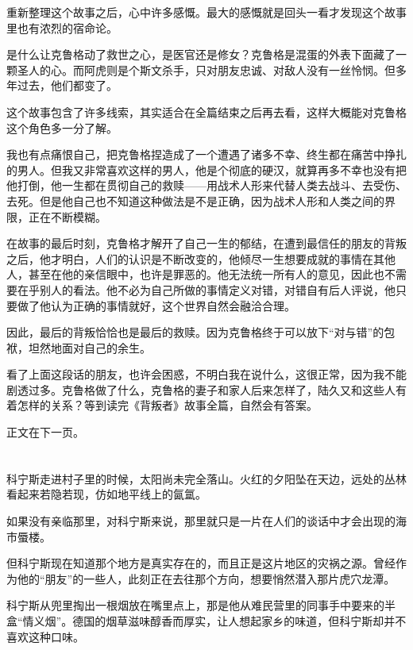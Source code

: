 



重新整理这个故事之后，心中许多感慨。最大的感慨就是回头一看才发现这个故事里也有浓烈的宿命论。

是什么让克鲁格动了救世之心，是医官还是修女？克鲁格是混蛋的外表下面藏了一颗圣人的心。而阿虎则是个斯文杀手，只对朋友忠诚、对敌人没有一丝怜悯。但多年过去，他们都变了。

这个故事包含了许多线索，其实适合在全篇结束之后再去看，这样大概能对克鲁格这个角色多一分了解。

我也有点痛恨自己，把克鲁格捏造成了一个遭遇了诸多不幸、终生都在痛苦中挣扎的男人。但我又非常喜欢这样的男人，他是个彻底的硬汉，就算再多不幸也没有把他打倒，他一生都在贯彻自己的救赎——用战术人形来代替人类去战斗、去受伤、去死。但是他自己也不知道这种做法是不是正确，因为战术人形和人类之间的界限，正在不断模糊。

在故事的最后时刻，克鲁格才解开了自己一生的郁结，在遭到最信任的朋友的背叛之后，他才明白，人们的认识是不断改变的，他倾尽一生想要成就的事情在其他人，甚至在他的亲信眼中，也许是罪恶的。他无法统一所有人的意见，因此也不需要在乎别人的看法。他不必为自己所做的事情定义对错，对错自有后人评说，他只要做了他认为正确的事情就好，这个世界自然会融洽合理。

因此，最后的背叛恰恰也是最后的救赎。因为克鲁格终于可以放下“对与错”的包袱，坦然地面对自己的余生。

看了上面这段话的朋友，也许会困惑，不明白我在说什么，这很正常，因为我不能剧透过多。克鲁格做了什么，克鲁格的妻子和家人后来怎样了，陆久又和这些人有着怎样的关系？等到读完《背叛者》故事全篇，自然会有答案。

正文在下一页。

\lineseparator


\section*{}

科宁斯走进村子里的时候，太阳尚未完全落山。火红的夕阳坠在天边，远处的丛林看起来若隐若现，仿如地平线上的氤氲。

如果没有亲临那里，对科宁斯来说，那里就只是一片在人们的谈话中才会出现的海市蜃楼。

但科宁斯现在知道那个地方是真实存在的，而且正是这片地区的灾祸之源。曾经作为他的“朋友”的一些人，此刻正在去往那个方向，想要悄然潜入那片虎穴龙潭。

科宁斯从兜里掏出一根烟放在嘴里点上，那是他从难民营里的同事手中要来的半盒“情义烟”。德国的烟草滋味醇香而厚实，让人想起家乡的味道，但科宁斯却并不喜欢这种口味。

